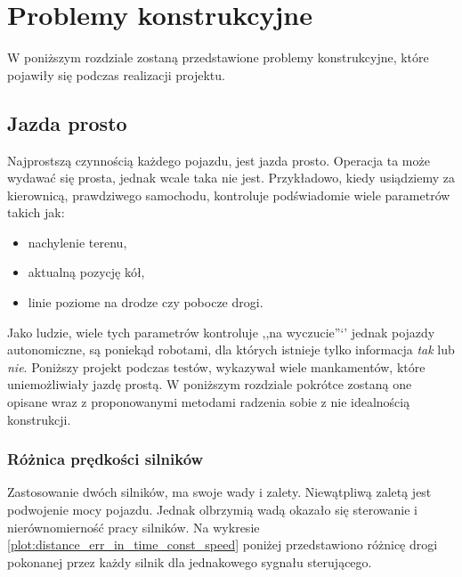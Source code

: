 \section{Problemy konstrukcyjne}
\label{sec:problemy_konstrukcyjne}
    W poniższym rozdziale zostaną przedstawione problemy konstrukcyjne,
    które pojawiły się podczas realizacji projektu.

    \subsection{Jazda prosto}
    \label{section:jazda_prosto}
        Najprostszą czynnością każdego pojazdu, jest jazda prosto.
        Operacja ta może wydawać się prosta, jednak wcale taka nie jest.
        Przykładowo, kiedy usiądziemy za kierownicą, prawdziwego samochodu, kontroluje podświadomie wiele parametrów takich jak:
        \begin{itemize}
            \item nachylenie terenu,
            \item aktualną pozycję kół,
            \item linie poziome na drodze czy pobocze drogi.
        \end{itemize}
        Jako ludzie, wiele tych parametrów kontroluje ,,na wyczucie''`' jednak pojazdy autonomiczne, są poniekąd robotami, dla których istnieje tylko informacja \textit{tak} lub \textit{nie}.
        Poniższy projekt podczas testów, wykazywał wiele mankamentów, które uniemożliwiały jazdę prostą.
        W poniższym rozdziale pokrótce zostaną one opisane wraz z proponowanymi metodami radzenia sobie z nie idealnością konstrukcji.
        
        \subsubsection{Różnica prędkości silników}
            Zastosowanie dwóch silników, ma swoje wady i zalety.
            Niewątpliwą zaletą jest podwojenie mocy pojazdu.
            Jednak olbrzymią wadą okazało się sterowanie i nierównomierność pracy silników.
            Na wykresie \ref{plot:distance_err_in_time_const_speed} poniżej przedstawiono różnicę drogi pokonanej przez każdy silnik dla jednakowego sygnału sterującego.

